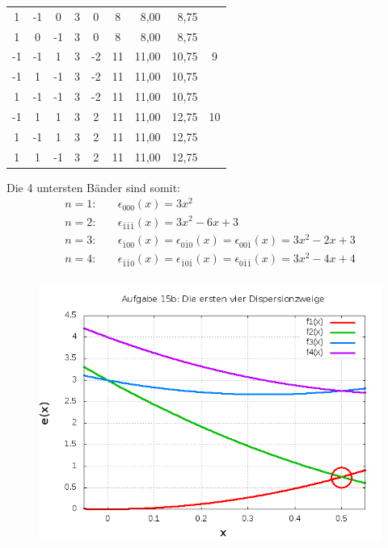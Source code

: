 \begin{table}[!ht]
\begin{center}
\begin{tabular}{|c|c|c|c|c|c|r|r|c|}
1 & -1 & 0 & 3 & 0 & 8 & 8,00 & 8,75 & \multicolumn{ 1}{c|}{} \\ \cline{ 1- 8}
1 & 0 & -1 & 3 & 0 & 8 & 8,00 & 8,75 & \multicolumn{ 1}{c|}{} \\ \hline
-1 & -1 & 1 & 3 & -2 & 11 & 11,00 & 10,75 & \multicolumn{ 1}{c|}{9} \\ \cline{ 1- 8}
-1 & 1 & -1 & 3 & -2 & 11 & 11,00 & 10,75 & \multicolumn{ 1}{c|}{} \\ \cline{ 1- 8}
1 & -1 & -1 & 3 & -2 & 11 & 11,00 & 10,75 & \multicolumn{ 1}{c|}{} \\ \hline
-1 & 1 & 1 & 3 & 2 & 11 & 11,00 & 12,75 & \multicolumn{ 1}{c|}{10} \\ \cline{ 1- 8}
1 & -1 & 1 & 3 & 2 & 11 & 11,00 & 12,75 & \multicolumn{ 1}{c|}{} \\ \cline{ 1- 8}
1 & 1 & -1 & 3 & 2 & 11 & 11,00 & 12,75 & \multicolumn{ 1}{c|}{} \\ \hline
\end{tabular}
\end{center}
\label{tab1}
\end{table}
Die 4 untersten Bänder sind somit:
\begin{align*}
n = 1:\quad & \epsilon_{000}(x) = 3 x^2 \\
n = 2:\quad & \epsilon_{\bar1\bar1\bar1}(x) =  3 x^2 - 6 x + 3\\
n = 3:\quad & \epsilon_{\bar100}(x) = \epsilon_{0\bar10}(x) = \epsilon_{00\bar1}(x) =  3 x^2  - 2 x + 3\\
n = 4:\quad & \epsilon_{\bar1\bar10}(x) = \epsilon_{\bar10\bar1}(x) = \epsilon_{0\bar1\bar1}(x) = 3 x^2 - 4 x + 4\\
\end{align*}

\begin{figure}
  \centering
  \includegraphics[width=11.5cm]{aufgabe15b.png}
\label{bild15b}
\end{figure}
